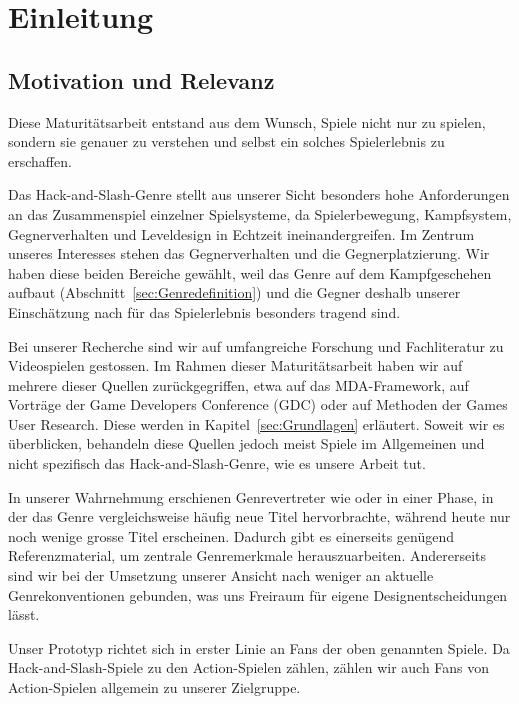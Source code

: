 \documentclass[../Main.tex]{subfiles}
\begin{document}
\section{Einleitung}

\subsection{Motivation und Relevanz}

Diese Maturitätsarbeit entstand aus dem Wunsch, Spiele nicht nur zu spielen, sondern sie genauer zu verstehen und selbst ein solches Spielerlebnis zu erschaffen.

Das Hack-and-Slash-Genre stellt aus unserer Sicht besonders hohe Anforderungen an das Zusammenspiel einzelner Spielsysteme, da Spielerbewegung, Kampfsystem, Gegnerverhalten und Leveldesign in Echtzeit ineinandergreifen. Im Zentrum unseres Interesses stehen das Gegnerverhalten und die Gegnerplatzierung. Wir haben diese beiden Bereiche gewählt, weil das Genre auf dem Kampfgeschehen aufbaut (Abschnitt~\ref{sec:Genredefinition}) und die Gegner deshalb unserer Einschätzung nach für das Spielerlebnis besonders tragend sind.

Bei unserer Recherche sind wir auf umfangreiche Forschung und Fachliteratur zu Videospielen gestossen. Im Rahmen dieser Maturitätsarbeit haben wir auf mehrere dieser Quellen zurückgegriffen, etwa auf das MDA-Framework\autocite{hunicke2004mda}, auf Vorträge der Game Developers Conference (GDC)\autocite{gdc_tenprinciples2010,gdc_leveldesignaday2020,gdc_movingmountains2020,gdc_horizonquests2018} oder auf Methoden der Games User Research\autocite{drachen2018gamesuserresearch}. Diese werden in Kapitel~\ref{sec:Grundlagen} erläutert. Soweit wir es überblicken, behandeln diese Quellen jedoch meist Spiele im Allgemeinen und nicht spezifisch das Hack-and-Slash-Genre, wie es unsere Arbeit tut.

In unserer Wahrnehmung erschienen Genrevertreter wie \autocite{koeitechmo_ninjagaiden_2012} oder \autocite{platinumgames_nierautomata_2017} in einer Phase, in der das Genre vergleichsweise häufig neue Titel hervorbrachte, während heute nur noch wenige grosse Titel erscheinen. Dadurch gibt es einerseits genügend Referenzmaterial, um zentrale Genremerkmale herauszuarbeiten. Andererseits sind wir bei der Umsetzung unserer Ansicht nach weniger an aktuelle Genrekonventionen gebunden, was uns Freiraum für eigene Designentscheidungen lässt.

Unser Prototyp richtet sich in erster Linie an Fans der oben genannten Spiele. Da Hack-and-Slash-Spiele zu den Action-Spielen zählen,\autocite{wikipedia_hackandslash} zählen wir auch Fans von Action-Spielen allgemein zu unserer Zielgruppe.
\end{document}
